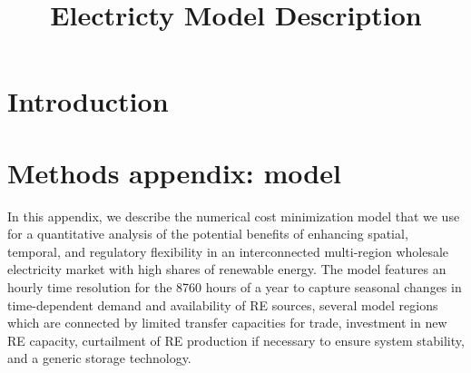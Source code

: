 \documentclass[authoryear]{elsarticle}
\begin{document}
\begin{frontmatter}
\title{Electricty Model Description} 





\begin{abstract}

\end{abstract}

\begin{keyword}
\end{keyword}




\end{frontmatter}


\section{Introduction} \label{sec:intro3}
\section{Methods appendix: model}
\label{sec:model}
In this appendix, we describe the numerical cost minimization model that we use for a quantitative analysis of the potential benefits of enhancing spatial, temporal, and regulatory flexibility in an interconnected multi-region wholesale electricity market with high shares of renewable energy. The model features an hourly time resolution for the 8760 hours of a year to capture seasonal changes in time-dependent demand and availability of RE sources, several model regions which are connected by limited transfer capacities for trade, investment in new RE capacity, curtailment of RE production if necessary to ensure system stability, and a generic storage technology.
\end{document}
